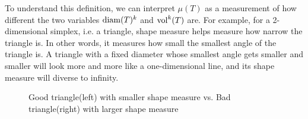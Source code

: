    To understand this definition, we can interpret $\mu(T)$ as a measurement of how different the two variables $\operatorname{diam}(T)^k$ and $\operatorname{vol}^k(T)$ are. For example, for a 2-dimensional simplex, i.e. a triangle, shape measure helps measure how narrow the triangle is. In other words, it measures how small the smallest angle of the triangle is. A triangle with a fixed diameter whose smallest angle gets smaller and smaller will look more and more like a one-dimensional line, and its shape measure will diverse to infinity.

    

    \begin{figure}
    \centering
    \caption{Good triangle(left) with smaller shape measure vs. Bad triangle(right) with larger shape measure}
    \label{Fig1}
    \end{figure}

